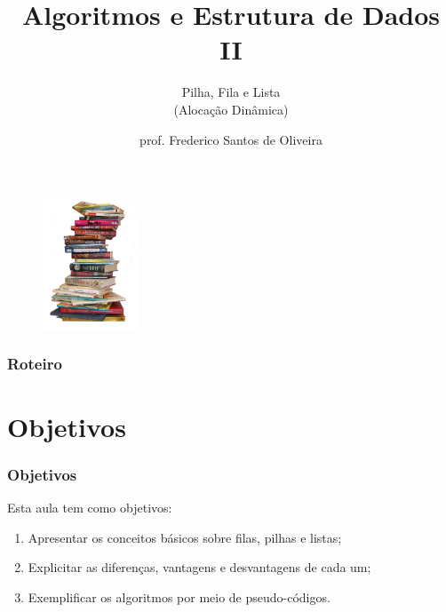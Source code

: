 \documentclass[aspectratio=169]{beamer}
\title[Pilha, Fila e Lista]{Algoritmos e Estrutura de Dados II}
\subtitle{Pilha, Fila e Lista\\(Alocação Dinâmica)}
\author[Frederico Santos de Oliveira]{prof. Frederico Santos de Oliveira}
\institute[UFMT]{Universidade Federal de Mato Grosso\\ Instituto de Engenharia}
\date{}
\begin{document}
\begin{frame}
\titlepage %

\begin{figure}[!h]
  \centering
   \includegraphics[width=80pt]{imgs/introducao.png}
  \label{fig_introducao}
\end{figure}
\end{frame}


\begin{frame}
\frametitle{Roteiro} %
\tableofcontents %
\end{frame}


\section{Objetivos}

\begin{frame}
\frametitle{Objetivos}

Esta aula tem como objetivos:

\begin{enumerate}
\item Apresentar os conceitos básicos sobre filas, pilhas e listas;
\item Explicitar as diferenças, vantagens e desvantagens de cada um;
\item Exemplificar os algoritmos por meio de pseudo-códigos.
\end{enumerate}

\end{frame}
\end{document}
